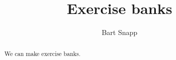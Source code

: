 \documentclass{ximera}
\title{Exercise banks}
\author{Bart Snapp}
\begin{document}
\begin{abstract}
We can make exercise banks.
\end{abstract}
\maketitle
\end{document}
